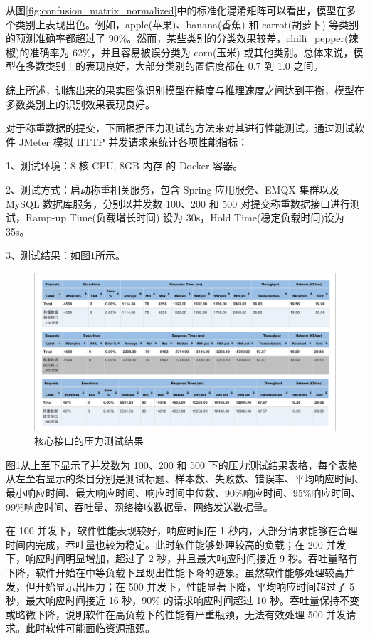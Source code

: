 从图\ref{fig:confusion_matrix_normalized}中的标准化混淆矩阵可以看出，模型在多个类别上表现出色。例如，apple(苹果)、banana(香蕉) 和 carrot(胡萝卜) 等类别的预测准确率都超过了 90\%。然而，某些类别的分类效果较差，chilli\_pepper(辣椒)的准确率为 62\%，并且容易被误分类为 corn(玉米) 或其他类别。总体来说，模型在多数类别上的表现良好，大部分类别的置信度都在 0.7 到 1.0 之间。

综上所述，训练出来的果实图像识别模型在精度与推理速度之间达到平衡，模型在多数类别上的识别效果表现良好。

对于称重数据的提交，下面根据压力测试的方法\cite{Zhu2017}来对其进行性能测试，通过测试软件 JMeter 模拟 HTTP 并发请求来统计各项性能指标：

1、测试环境：8 核 CPU, 8GB 内存 的 Docker 容器。

2、测试方式：启动称重相关服务，包含 Spring 应用服务、EMQX 集群以及MySQL 数据库服务，分别以并发数 100、200 和 500 对提交称重数据接口进行测试，Ramp-up Time(负载增长时间) 设为 30s，Hold Time(稳定负载时间)设为 35s。

3、测试结果：如图\ref{fig:jmeter-test-result}所示。

\begin{figure}[H]
    \centering
    \includegraphics[width=0.8\linewidth]{../source/aws-test/result.png}
    \caption{核心接口的压力测试结果}
    \label{fig:jmeter-test-result}
\end{figure}

图\ref{fig:jmeter-test-result}从上至下显示了并发数为 100、200 和 500 下的压力测试结果表格，每个表格从左至右显示的条目分别是测试标题、样本数、失败数、错误率、平均响应时间、最小响应时间、最大响应时间、响应时间中位数、90\%响应时间、95\%响应时间、99\%响应时间、吞吐量、网络接收数据量、网络发送数据量。

在 100 并发下，软件性能表现较好，响应时间在 1 秒内，大部分请求能够在合理时间内完成，吞吐量也较为稳定。此时软件能够处理较高的负载；在 200 并发下，响应时间明显增加，超过了 2 秒，并且最大响应时间接近 9 秒。吞吐量略有下降，软件开始在中等负载下显现出性能下降的迹象。虽然软件能够处理较高并发，但开始显示出压力；在 500 并发下，性能显著下降，平均响应时间超过了 5 秒，最大响应时间接近 16 秒，90\% 的请求响应时间超过 10 秒。吞吐量保持不变或略微下降，说明软件在高负载下的性能有严重瓶颈，无法有效处理 500 并发请求。此时软件可能面临资源瓶颈。

